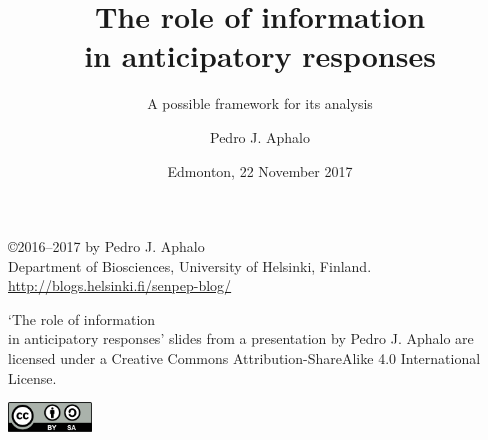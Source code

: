 \documentclass[10pt]{beamer}\usepackage[]{graphicx}\usepackage[]{color}
\begin{document}

\title{The role of information\\in anticipatory responses}
\subtitle{A possible framework for its analysis}
\author{Pedro J. Aphalo}
\date{Edmonton, 22 November 2017}


	\begin{frame}
		\maketitle
	\end{frame}

	\begin{frame}[c]
		\begin{center}
			\begin{small}
				\copyright 2016--2017 by Pedro J. Aphalo\\
				Department of Biosciences, University of Helsinki, Finland.\\
				\textcolor{blue}{\url{http://blogs.helsinki.fi/senpep-blog/}}\\[2ex]
			\end{small}

			\begin{footnotesize}
				`The role of information\\in anticipatory responses' slides from a presentation by Pedro J. Aphalo are licensed under a Creative Commons Attribution-ShareAlike 4.0 International License.\\[2ex]

			\end{footnotesize}

			\includegraphics[width=6em]{figures/by-sa}
		\end{center}
	\end{frame}
\end{document}
